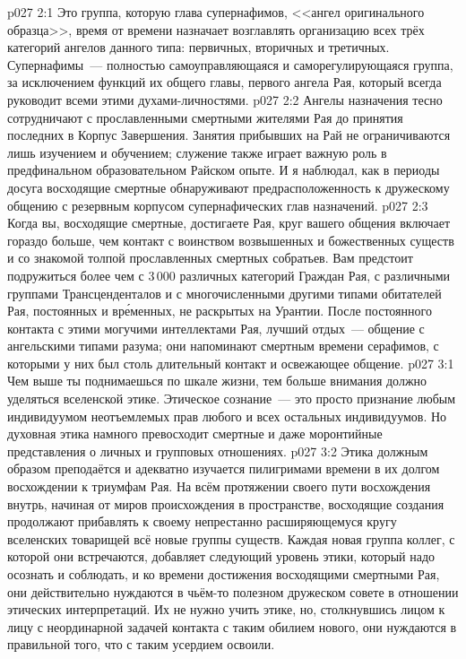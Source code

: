 \vs p027 2:1 Это группа, которую глава супернафимов, <<ангел оригинального образца>>, время от времени назначает возглавлять организацию всех трёх категорий ангелов данного типа: первичных, вторичных и третичных. Супернафимы~--- полностью самоуправляющаяся и саморегулирующаяся группа, за исключением функций их общего главы, первого ангела Рая, который всегда руководит всеми этими духами\hyp{}личностями.
\vs p027 2:2 Ангелы назначения тесно сотрудничают с прославленными смертными жителями Рая до принятия последних в Корпус Завершения. Занятия прибывших на Рай не ограничиваются лишь изучением и обучением; служение также играет важную роль в предфинальном образовательном Райском опыте. И я наблюдал, как в периоды досуга восходящие смертные обнаруживают предрасположенность к дружескому общению с резервным корпусом супернафических глав назначений.
\vs p027 2:3 Когда вы, восходящие смертные, достигаете Рая, круг вашего общения включает гораздо больше, чем контакт с воинством возвышенных и божественных существ и со знакомой толпой прославленных смертных собратьев. Вам предстоит подружиться более чем с 3\,000 различных категорий Граждан Рая, с различными группами Трансценденталов и с многочисленными другими типами обитателей Рая, постоянных и вр\'еменных, не раскрытых на Урантии. После постоянного контакта с этими могучими интеллектами Рая, лучший отдых~--- общение с ангельскими типами разума; они напоминают смертным времени серафимов, с которыми у них был столь длительный контакт и освежающее общение.
\vs p027 3:1 Чем выше ты поднимаешься по шкале жизни, тем больше внимания должно уделяться вселенской этике. Этическое сознание~--- это просто признание любым индивидуумом неотъемлемых прав любого и всех остальных индивидуумов. Но духовная этика намного превосходит смертные и даже моронтийные представления о личных и групповых отношениях.
\vs p027 3:2 Этика должным образом преподаётся и адекватно изучается пилигримами времени в их долгом восхождении к триумфам Рая. На всём протяжении своего пути восхождения внутрь, начиная от миров происхождения в пространстве, восходящие создания продолжают прибавлять к своему непрестанно расширяющемуся кругу вселенских товарищей всё новые группы существ. Каждая новая группа коллег, с которой они встречаются, добавляет следующий уровень этики, который надо осознать и соблюдать, и ко времени достижения восходящими смертными Рая, они действительно нуждаются в чьём\hyp{}то полезном дружеском совете в отношении этических интерпретаций. Их не нужно учить этике, но, столкнувшись лицом к лицу с неординарной задачей контакта с таким обилием нового, они нуждаются в правильной  того, что с таким усердием освоили.
